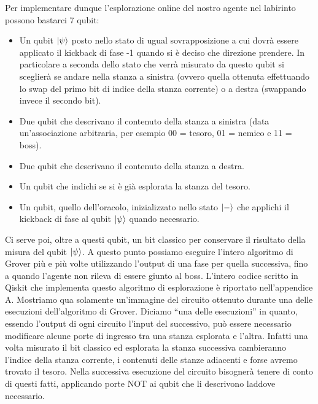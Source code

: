\documentclass{book}
\theoremstyle{definition}
\theoremstyle{definition}
\theoremstyle{definition}
\theoremstyle{plain}
\theoremstyle{plain}
\theoremstyle{plain}
\theoremstyle{plain}
\begin{document}
Per implementare dunque l'esplorazione online del nostro agente nel labirinto possono bastarci 7 qubit: 
\begin{itemize}
    \item Un qubit $\ket{\psi}$ posto nello stato di ugual sovrapposizione a cui dovrà essere applicato il kickback di fase -1 quando si è deciso che direzione prendere. In particolare a seconda dello stato che verrà misurato da questo qubit si sceglierà se andare nella stanza a sinistra (ovvero quella ottenuta effettuando lo swap del primo bit di indice della stanza corrente) o a destra (swappando invece il secondo bit).
    \item Due qubit che descrivano il contenuto della stanza a sinistra (data un'associazione arbitraria, per esempio 00 = tesoro, 01 = nemico e 11 = boss).
    \item Due qubit che descrivano il contenuto della stanza a destra.
    \item Un qubit che indichi se si è già esplorata la stanza del tesoro.
    \item Un qubit, quello dell'oracolo, inizializzato nello stato $\ket{-}$ che applichi il kickback di fase al qubit $\ket{\psi}$ quando necessario.
\end{itemize}
Ci serve poi, oltre a questi qubit, un bit classico per conservare il risultato della misura del qubit $\ket{\psi}$. A questo punto possiamo eseguire l'intero algoritmo di Grover più e più volte utilizzando l'output di una fase per quella successiva, fino a quando l'agente non rileva di essere giunto al boss. L'intero codice scritto in Qiskit che implementa questo algoritmo di esplorazione è riportato nell'appendice A. Mostriamo qua solamente un'immagine del circuito ottenuto durante una delle esecuzioni dell'algoritmo di Grover. Diciamo ``una delle esecuzioni'' in quanto, essendo l'output di ogni circuito l'input del successivo, può essere necessario modificare alcune porte di ingresso tra una stanza esplorata e l'altra. Infatti una volta misurato il bit classico ed esplorata la stanza successiva cambieranno l'indice della stanza corrente, i contenuti delle stanze adiacenti e forse avremo trovato il tesoro. Nella successiva esecuzione del circuito bisognerà tenere di conto di questi fatti, applicando porte NOT ai qubit che li descrivono laddove necessario.
\end{document}
